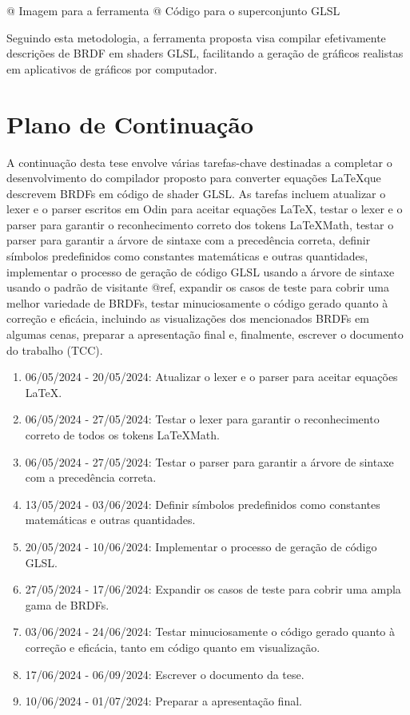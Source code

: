 \documentclass[english, 
               brazil, 
               bsc] %
               {dcomp-abntex2}
\begin{document}
@ Imagem para a ferramenta
@ Código para o superconjunto GLSL

Seguindo esta metodologia, a ferramenta proposta visa compilar efetivamente descrições de BRDF em shaders GLSL, facilitando a geração de gráficos realistas em aplicativos de gráficos por computador.

\section{Plano de Continuação} \label{continuacao}

A continuação desta tese envolve várias tarefas-chave destinadas a completar o desenvolvimento do compilador proposto para converter equações \LaTeX  que descrevem BRDFs em código de shader GLSL. As tarefas incluem atualizar o lexer e o parser escritos em Odin para aceitar equações \LaTeX , testar o lexer e o parser para garantir o reconhecimento correto dos tokens \LaTeX  Math, testar o parser para garantir a árvore de sintaxe com a precedência correta, definir símbolos predefinidos como constantes matemáticas e outras quantidades, implementar o processo de geração de código GLSL usando a árvore de sintaxe usando o padrão de visitante @ref, expandir os casos de teste para cobrir uma melhor variedade de BRDFs, testar minuciosamente o código gerado quanto à correção e eficácia, incluindo as visualizações dos mencionados BRDFs em algumas cenas, preparar a apresentação final e, finalmente, escrever o documento do trabalho (TCC).

\begin{enumerate}
\item 06/05/2024 - 20/05/2024: Atualizar o lexer e o parser para aceitar equações \LaTeX .
\item 06/05/2024 - 27/05/2024: Testar o lexer para garantir o reconhecimento correto de todos os tokens \LaTeX  Math.
\item 06/05/2024 - 27/05/2024: Testar o parser para garantir a árvore de sintaxe com a precedência correta.
\item 13/05/2024 - 03/06/2024: Definir símbolos predefinidos como constantes matemáticas e outras quantidades.
\item 20/05/2024 - 10/06/2024: Implementar o processo de geração de código GLSL.
\item 27/05/2024 - 17/06/2024: Expandir os casos de teste para cobrir uma ampla gama de BRDFs.
\item 03/06/2024 - 24/06/2024: Testar minuciosamente o código gerado quanto à correção e eficácia, tanto em código quanto em visualização.
\item 17/06/2024 - 06/09/2024: Escrever o documento da tese.
\item 10/06/2024 - 01/07/2024: Preparar a apresentação final.
\end{enumerate}
\end{document}
